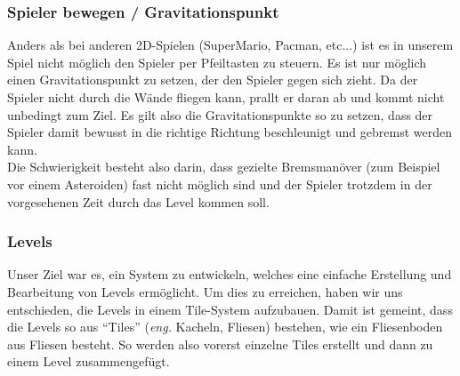 \documentclass[12pt,a4paper]{scrartcl}
\newcommand{\q}[1]{``#1''}
\begin{document}
\subsubsection{Spieler bewegen / Gravitationspunkt}
Anders als bei anderen 2D-Spielen (SuperMario, Pacman, etc...) ist es in unserem Spiel nicht
möglich den Spieler per Pfeiltasten zu steuern. Es ist nur möglich einen Gravitationspunkt zu setzen, der den Spieler gegen sich zieht.
Da der Spieler nicht durch die Wände fliegen kann, prallt er daran ab und kommt nicht unbedingt zum Ziel. Es gilt also
die Gravitationspunkte so zu setzen, dass der Spieler damit bewusst in die richtige Richtung beschleunigt und gebremst werden kann.\\

Die Schwierigkeit besteht also darin, dass gezielte Bremsmanöver (zum Beispiel vor einem Asteroiden) fast nicht möglich sind und 
der Spieler trotzdem in der vorgesehenen Zeit durch das Level kommen soll.


\subsubsection{Levels}
Unser Ziel war es, ein System zu entwickeln, welches eine einfache Erstellung und Bearbeitung von Levels ermöglicht. Um dies zu erreichen, haben wir uns entschieden, die Levels in einem Tile-System aufzubauen. Damit ist gemeint, dass die Levels so aus \q{Tiles} (\textit{eng.} Kacheln, Fliesen) bestehen, wie ein Fliesenboden aus Fliesen besteht. So werden also vorerst einzelne Tiles erstellt und dann zu einem Level zusammengefügt.\\
\end{document}

